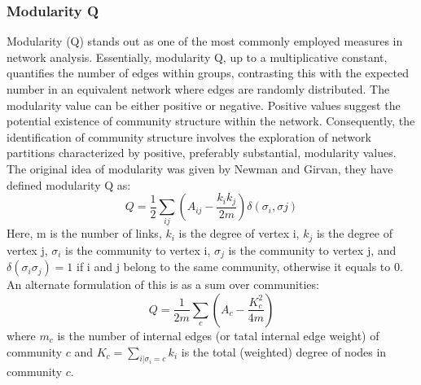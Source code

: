 \subsubsection{Modularity Q}
Modularity (Q) stands out as one of the most commonly employed measures in network analysis. Essentially, modularity Q, up to a multiplicative constant, quantifies the number of edges within groups, contrasting this with the expected number in an equivalent network where edges are randomly distributed. The modularity value can be either positive or negative. Positive values suggest the potential existence of community structure within the network. Consequently, the identification of community structure involves the exploration of network partitions characterized by positive, preferably substantial, modularity values.\\
The original idea of modularity was given by Newman and Girvan, they have defined modularity Q as:\\
$$Q=\frac{1}{2}\sum_{ij}(A_{ij}-\frac{k_{i}k_{j}}{2m})\delta(\sigma_{i},\sigma{j})$$
Here, m is the number of links, $k_{i}$ is the degree of vertex i, $k_{j}$ is the degree of vertex j, $\sigma_{i}$ is the community to vertex i, $\sigma_{j}$ is the community to vertex j, and $\delta(\sigma_{i}\sigma_{j}) = 1$ if i and j belong to the same community, otherwise it equals to 0.\\
An alternate formulation of this is as a sum over communities:
$$Q=\frac{1}{2m}\sum_{c}(A_{c}-\frac{K_{c}^{2}}{4m})$$
where $m_{c}$ is the number of internal edges (or tatal internal edge weight) of community $c$ and $K_{c} = \sum_{i|\sigma_{i}=c}k_{i}$ is the total (weighted) degree of nodes in community $c$.
